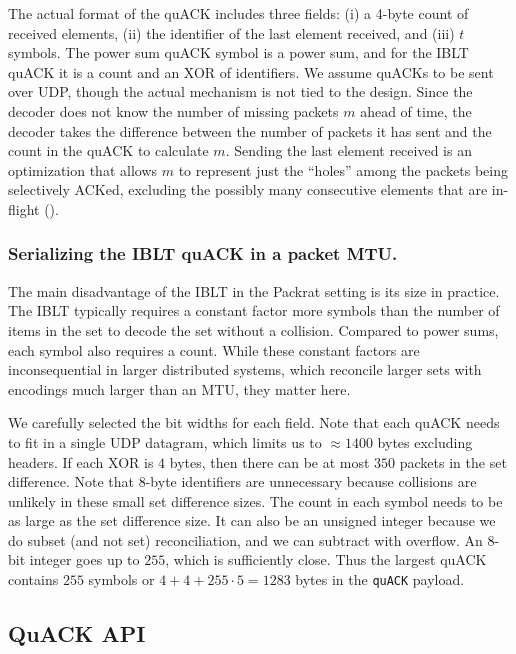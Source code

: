 The actual format of the quACK includes three fields: (i) a 4-byte count of
received elements, (ii) the identifier of the last element received, and
(iii) $t$ symbols. The power sum quACK symbol is a power sum, and for the IBLT
quACK it is a count and an XOR of identifiers. We assume quACKs to be sent over
UDP, though the actual mechanism is not tied to the design. Since the decoder
does not know the number of missing packets $m$ ahead of time, the decoder
takes the difference between the number of packets it has sent and the count in
the quACK to calculate $m$. Sending the last element received is an
optimization that allows $m$ to represent just the ``holes'' among the packets
being selectively ACKed, excluding the possibly many consecutive elements that
are in-flight ().

\subsubsection{Serializing the IBLT quACK in a packet MTU.}

The main disadvantage of the IBLT in
the Packrat setting is its size in practice. The IBLT typically requires a constant factor
more symbols than the number of items in the set to decode the set without a
collision. Compared to power sums, each symbol also requires a count. While
these constant factors are inconsequential in larger distributed systems,
which reconcile larger sets with encodings much larger than an MTU, they
matter here.

We carefully selected the bit widths for each field. Note that each quACK needs
to fit in a single UDP datagram, which limits us to $\approx\!1400$ bytes
excluding headers. If each XOR is $4$ bytes, then there can be at most $350$
packets in the set difference. Note that $8$-byte identifiers are unnecessary
because collisions are unlikely in these small set difference sizes. The count
in each symbol needs to be as large as the set difference size. It can also be
an unsigned integer because we do subset (and not set) reconciliation, and we
can subtract with overflow. An 8-bit integer goes up to $255$, which is
sufficiently close. Thus the largest quACK contains $255$ symbols or $4 +
4 + 255 \cdot 5 = 1283$ bytes in the \texttt{quACK} payload.

\subsection{QuACK API}

